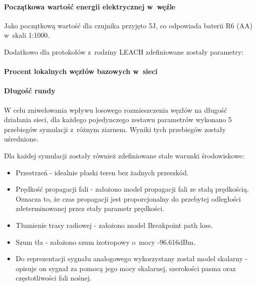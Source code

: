 \paragraph{Początkowa wartość energii elektrycznej w~węźle}
Jako początkową wartość dla czujnika przyjęto 5J, co odpowiada baterii R6 (AA) w~skali 1:1000.

Dodatkowo dla protokołów z~rodziny LEACH zdefiniowane zostały parametry:
\paragraph{Procent lokalnych węzłów bazowych w~sieci}
\paragraph{Długość rundy}

W celu zniwelowania wpływu losowego rozmieszczenia węzłów na długość działania sieci, dla każdego pojedynczego zestawu parametrów wykonano 5 przebiegów symulacji z~różnym ziarnem. Wyniki tych przebiegów zostały uśrednione.

Dla każdej symulacji zostały również zdefiniowane stałe warunki środowiskowe:
\begin{itemize}
	\item Przestrzeń - idealnie płaski teren bez żadnych przeszkód.
	\item Prędkość propagacji fali - założono model propagacji fali ze stałą prędkością. Oznacza to, że czas propagacji jest proporcjonalny do przebytej odległości zdeterminowanej przez stały parametr prędkości.
	\item Tłumienie trasy radiowej - założono model Breakpoint path loss.
	\item Szum tła - założono szum izotropowy o~mocy -96.616dBm.
	\item Do reprezentacji sygnału analogowego wykorzystany został model skalarny - opisuje on sygnał za pomocą jego mocy skalarnej, szerokości pasma oraz częstotliwości fali nośnej.
\end{itemize}